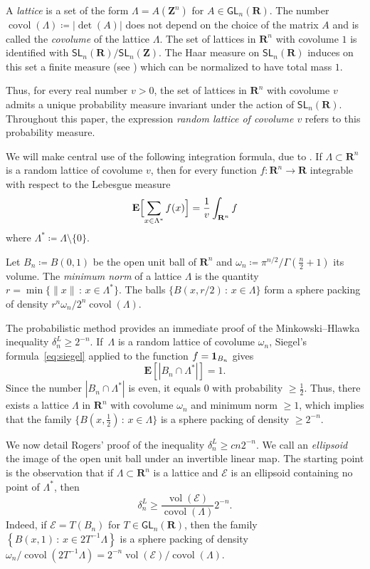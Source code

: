 \documentclass[12pt]{amsart}
\newcommand{\R}{\mathbf{R}}
\newcommand{\Z}{\mathbf{Z}}
\newcommand{\E}{\mathbf{E}}
\newcommand{\gGL}{\mathsf{GL}}
\newcommand{\gSL}{\mathsf{SL}}
\DeclareMathOperator{\vol}{vol}
\DeclareMathOperator{\covol}{covol}
\renewcommand{\geq}{\geqslant}
\theoremstyle{plain}
\theoremstyle{remark}
\begin{document}
A \emph{lattice} is a set of the form $\Lambda = A ( \Z^n)$ for $A \in \gGL_n(\R)$. The number $\covol(\Lambda) \coloneqq |\det(A)|$ does not depend on the choice of the matrix $A$ and is called the \emph{covolume} of the lattice $\Lambda$. The set of lattices in $\R^n$ with covolume $1$ is identified with $\gSL_n(\R) / \gSL_n(\Z)$. The Haar measure on $\gSL_n(\R)$ induces on this set a finite measure (see \cite[Section~2.2]{Benoist09}) which can be normalized to have total mass $1$.
 
Thus, for every real number $v>0$, the set of lattices in $\R^n$ with covolume $v$ admits a unique probability measure invariant under the action of $\gSL_n(\R)$. Throughout this paper, the expression \emph{random lattice of covolume $v$} refers to this probability measure.
 
We will make central use of the following integration formula, due to \cite{Siegel45}. If $\Lambda \subset \R^n$ is a random lattice of covolume $v$, then for every function $f \colon  \R^n \to \R$ integrable with respect to the Lebesgue measure
\begin{equation} \label{eq:siegel}
\E \Bigl[ \sum_{x \in \Lambda^*} f(x) \Bigr] = \frac{1}{v} \int_{\R^n} f
\end{equation}
where $\Lambda^* \coloneqq \Lambda \setminus \{0\}$.
 
Let $B_n \coloneqq B(0,1)$ be the open unit ball of $\R^n$ and
$\omega_n \coloneqq \pi^{n/2} / \Gamma \left( \frac{n}{2} +1 \right)$ its volume. The \emph{minimum norm} of a lattice $\Lambda$ is the quantity $r = \min \{ \|x\| \, : \, x \in \Lambda^*\}$. The balls $\{B(x,r/2) \, : \, x \in \Lambda \}$ form a sphere packing of density $r^n \omega_n/2^n\covol(\Lambda)$.
 
 
The probabilistic method provides an immediate proof of the Minkowski--Hlawka inequality $\delta_n^L \geq 2^{-n}$. If~$\Lambda$ is a random lattice of covolume $\omega_n$, Siegel's formula~\eqref{eq:siegel} applied to the function $f = {\bf 1}_{B_n}$ gives
\[ \E \left[ |B_n \cap \Lambda^*| \right] = 1. \]
Since the number $|B_n \cap \Lambda^*|$ is even, it equals $0$ with probability $\geq \frac 12$. Thus, there exists a lattice
 $\Lambda$ in $\R^n$ with covolume $\omega_n$ and minimum norm $\geq 1$, which implies that the family $\{ B(x,\frac{1}{2}) \, : \, x \in \Lambda \}$ is a sphere packing of density $\geq 2^{-n}$.
 
We now detail Rogers' proof of the inequality $\delta_n^L \geq cn2^{-n}$. We call an \emph{ellipsoid} the image of the open unit ball under an invertible linear map. The starting point is the observation that if $\Lambda \subset \R^n$ is a lattice and $\mathcal{E}$ is an ellipsoid containing no point of $\Lambda^*$, then
\begin{equation} \label{eq:ellipsoidpacking} \delta_n^L \geq \frac{\vol (\mathcal{E})}{\covol (\Lambda)} 2^{-n}.\end{equation}
Indeed, if $\mathcal{E} = T(B_n)$ for $T \in \gGL_n(\R)$, then the family $\left\{ B(x,1) \, : \, x \in 2 T^{-1}\Lambda \right\}$ is a sphere packing of density $\omega_n/\covol(2T^{-1}\Lambda)=2^{-n}\vol(\mathcal{E})/\covol(\Lambda)$.
 
\end{document}
